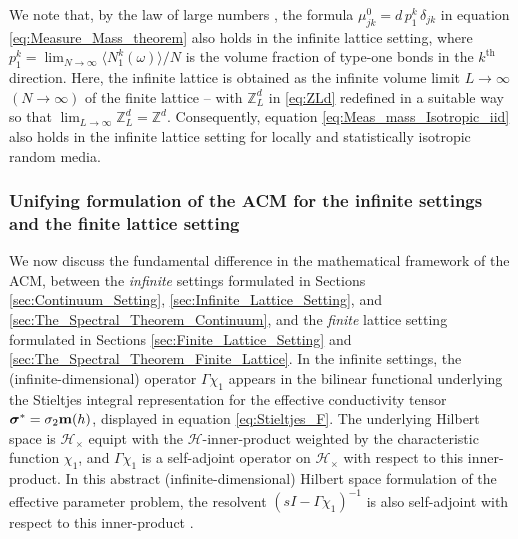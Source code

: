 \documentclass{cmslatex}
\newcommand\bsig{\mbox{\boldmath${\sigma}$}}
\begin{document}
We note that, by the law of large numbers
\cite{Durrett:Book:Probability}, the formula
$\mu_{jk}^0=d\,p_1^k\,\delta_{jk}$ in equation
\eqref{eq:Measure_Mass_theorem} also holds in the infinite lattice
setting, where $p_1^k=\lim_{N\to\infty}\langle N_1^k(\omega)\rangle/N$ is the volume fraction 
of type-one bonds in the $k^{\text{th}}$ direction. Here, the infinite
lattice is obtained as the infinite volume limit $L\to\infty$ $(N\to\infty)$ of the
finite lattice -- with $\mathbb{Z}_L^d$ in \eqref{eq:ZLd} redefined in a
suitable way so that $\lim_{L\to\infty}\mathbb{Z}_L^d=\mathbb{Z}^d$. Consequently, equation
\eqref{eq:Meas_mass_Isotropic_iid} also holds in the infinite lattice
setting for locally and statistically isotropic random media.





\subsubsection{Unifying formulation of the ACM for the infinite
  settings and the finite lattice setting}\label{sec:Unification_finite_infinite}
%
We now discuss the fundamental difference in the mathematical
framework of the ACM, between the \emph{infinite}
settings formulated in Sections \ref{sec:Continuum_Setting},
\ref{sec:Infinite_Lattice_Setting}, and
\ref{sec:The_Spectral_Theorem_Continuum}, and the \emph{finite}
lattice setting formulated in Sections
\ref{sec:Finite_Lattice_Setting} and
\ref{sec:The_Spectral_Theorem_Finite_Lattice}. In the infinite 
settings, the (infinite-dimensional) operator $\Gamma\chi_1$ appears in the
bilinear functional underlying the Stieltjes integral representation
for the effective conductivity tensor $\bsig^*=\sigma_2\mathbf{m}(h)$,
displayed in equation \eqref{eq:Stieltjes_F}. The underlying Hilbert
space is $\mathscr{H}_\times$ equipt with the $\mathscr{H}$-inner-product
weighted by the characteristic function $\chi_1$, and $\Gamma\chi_1$
is a self-adjoint operator on $\mathscr{H}_\times$ with respect to this
inner-product. In this abstract (infinite-dimensional) Hilbert space
formulation of the effective parameter problem, the resolvent
$(sI-\Gamma\chi_1)^{-1}$ is also self-adjoint with respect to this
inner-product \cite{Stone:64}. 
\end{document}
